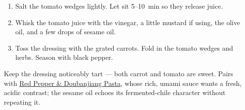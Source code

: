 \label{carrot-tomato-vinaigrette}

\begin{ingredients}
\end{ingredients}


\begin{recipe}
  \begin{enumerate}

  \item Salt the tomato wedges lightly.  Let sit 5--10~min so they
    release juice.

  \item Whisk the tomato juice with the vinegar, a little mustard if
    using, the olive oil, and a few drops of sesame oil.

  \item Toss the dressing with the grated carrots.  Fold in the
    tomato wedges and herbs.  Season with black pepper.

  \end{enumerate}
\end{recipe}

\notes{} Keep the dressing noticeably tart --- both carrot and
tomato are sweet.  Pairs with \hyperref[pasta-poivron-doubanjiang]{Red
Pepper \& Doubanjiang Pasta}, whose rich, umami sauce wants a fresh,
acidic contrast; the sesame oil echoes its fermented-chile character
without repeating it.
